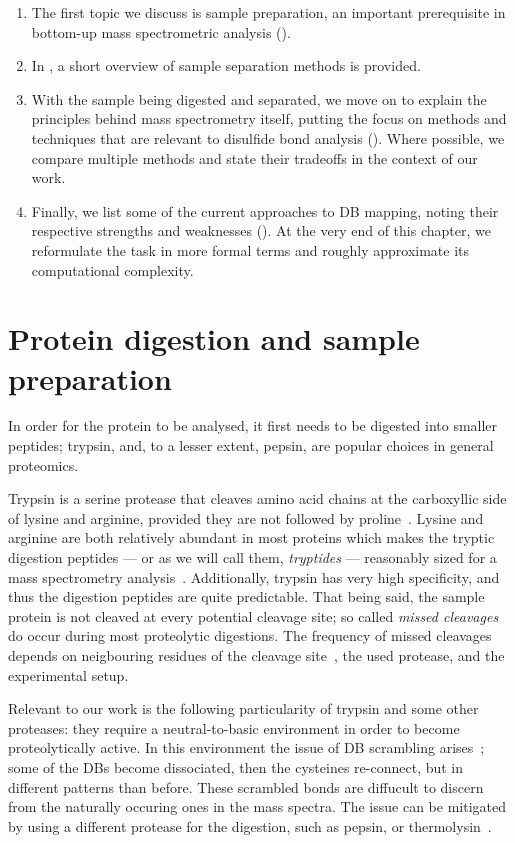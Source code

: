 \begin{enumerate}
  \item The first topic we discuss is sample preparation, an important prerequisite in bottom-up mass spectrometric analysis ().
  \item In , a short overview of sample separation methods is provided.
  \item With the sample being digested and separated, we move on to explain the principles behind mass spectrometry itself, putting the focus on methods and techniques that are relevant to disulfide bond analysis (). Where possible, we compare multiple methods and state their tradeoffs in the context of our work.
  \item Finally, we list some of the current approaches to DB mapping, noting their respective strengths and weaknesses (). At the very end of this chapter, we reformulate the task in more formal terms and roughly approximate its computational complexity.
\end{enumerate}

\section{Protein digestion and sample preparation}\label{sec:trypsin}

In order for the protein to be analysed, it first needs to be digested into smaller peptides; trypsin, and, to a lesser extent, pepsin, are popular choices in general proteomics.

Trypsin is a serine protease that cleaves amino acid chains at the carboxyllic side of lysine and arginine, provided they are not followed by proline~\cite{olsen2004trypsin}. Lysine and arginine are both relatively abundant in most proteins which makes the tryptic digestion peptides --- or as we will call them, \emph{tryptides} --- reasonably sized for a mass spectrometry analysis~\cite{matthiesen2020trypticsize}. Additionally, trypsin has very high specificity, and thus the digestion peptides are quite predictable. That being said, the sample protein is not cleaved at every potential cleavage site; so called \emph{missed cleavages} do occur during most proteolytic digestions. The frequency of missed cleavages depends on neigbouring residues of the cleavage site~\cite{gershon2014cleaved}, the used protease, and the experimental setup.

Relevant to our work is the following particularity of trypsin and some other proteases: they require a neutral-to-basic environment in order to become proteolytically active. In this environment the issue of DB scrambling arises~\cite{wu1997novel}; some of the DBs become dissociated, then the cysteines re-connect, but in different patterns than before. These scrambled bonds are diffucult to discern from the naturally occuring ones in the mass spectra. The issue can be mitigated by using a different protease for the digestion, such as pepsin, or thermolysin~\cite{sung2016evaluation}.

